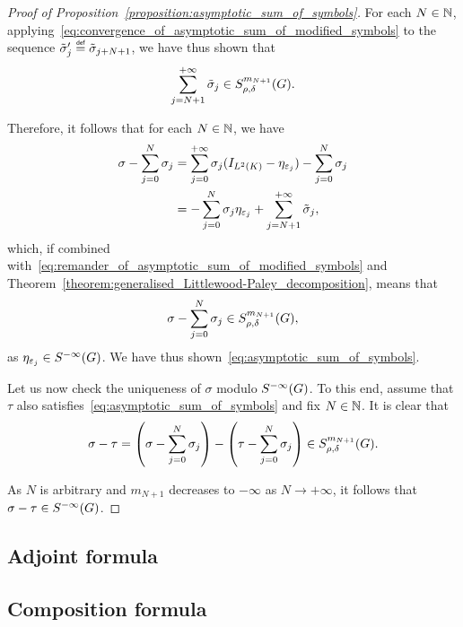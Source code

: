 \begin{proof}[Proof of Proposition~\ref{proposition:asymptotic_sum_of_symbols}]
    For each $N \in \mathbb{N}$,
    applying~\eqref{eq:convergence_of_asymptotic_sum_of_modified_symbols} to the sequence $\tilde \sigma'_j \defeq \tilde \sigma_{j + N + 1}$,
    we have thus shown that
    \begin{align}
        \sum_{j = N + 1}^{+\infty} \tilde \sigma_j
        \in S^{m_{N + 1}}_{\rho, \delta}(G).
        \label{eq:remander_of_asymptotic_sum_of_modified_symbols}
    \end{align}

    Therefore,
    it follows that for each $N \in \mathbb{N}$,
    we have
    \begin{align*}
        \sigma - \sum_{j = 0}^N \sigma_j
        &= \sum_{j = 0}^{+\infty} \sigma_j ({I_{{L^{2} (K)}}} - \eta_{\varepsilon_j}) - \sum_{j = 0}^N \sigma_j\\
        &= -\sum_{j = 0}^N \sigma_j \eta_{\varepsilon_j} + \sum_{j = N + 1}^{+\infty} \tilde \sigma_j,
    \end{align*}
    which, if combined with~\eqref{eq:remander_of_asymptotic_sum_of_modified_symbols}
    and Theorem~\ref{theorem:generalised_Littlewood-Paley_decomposition},
    means that
    \begin{align*}
        \sigma - \sum_{j = 0}^N \sigma_j
        \in S^{m_{N + 1}}_{\rho, \delta}(G),
    \end{align*}
    as $\eta_{\varepsilon_j} \in {S^{-\infty} (G)}$.
    We have thus shown~\eqref{eq:asymptotic_sum_of_symbols}.

    Let us now check the uniqueness of $\sigma$ modulo ${S^{-\infty} (G)}$.
    To this end,
    assume that $\tau$ also satisfies~\eqref{eq:asymptotic_sum_of_symbols}
    and fix $N \in \mathbb{N}$.
    It is clear that
    \begin{align*}
        \sigma - \tau
        = \left(\sigma - \sum_{j = 0}^N \sigma_j\right) -
        \left(\tau - \sum_{j = 0}^N \sigma_j\right)
        \in S^{m_{N + 1}}_{\rho, \delta}(G).
    \end{align*}

    As $N$ is arbitrary
    and $m_{N + 1}$ decreases to $-\infty$ as $N \to +\infty$,
    it follows that $\sigma - \tau \in {S^{-\infty} (G)}$.
\end{proof}

\subsection{Adjoint formula}

\subsection{Composition formula}


